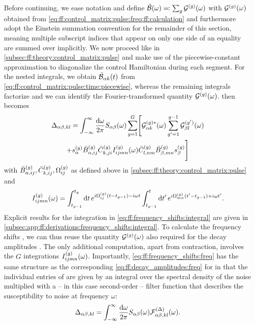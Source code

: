 Before continuing, we ease notation and define $\tilde{\mathcal{B}}(\omega) \eqqcolon \sum_g\mathcal{G}^{(g)}(\omega)$ with $\mathcal{G}^{(g)}(\omega)$ obtained from \cref{eq:ff:control_matrix:pulse:freq:ff:calculation} and furthermore adopt the Einstein summation convention for the remainder of this section, meaning multiple subscript indices that appear on only one side of an equality are summed over implicitly.
We now proceed like in \cref{subsec:ff:theory:control_matrix:pulse} and make use of the piecewise-constant approximation to diagonalize the control Hamiltonian during each segment.
For the nested integrals, we obtain $\tilde{\mathcal{B}}_{\alpha k}(t)$ from \cref{eq:ff:control_matrix:pulse:time:piecewise}, whereas the remaining integrals factorize and we can identify the Fourier-transformed quantity $\mathcal{G}^{(g)}(\omega)$.
 then becomes
\begin{multline}\label{eq:ff:frequency_shifts:freq}
    \Delta_{\alpha\beta,kl} = \int_{-\infty}^\infty\frac{\dd{\omega}}{2\pi} S_{\alpha\beta}(\omega)\sum_{g=1}^G\Biggl[
        \mathcal{G}_{\alpha k}^{(g)\ast}(\omega)\sum_{g^\prime=1}^{g-1}\mathcal{G}_{\beta l}^{(g^\prime)}(\omega) \\
        + s_\alpha^{(g)}\bar{B}_{\alpha,ij}^{(g)}\bar{C}_{k,ji}^{(g)} I_{ijmn}^{(g)}(\omega)
        \bar{C}_{l,nm}^{(g)}\bar{B}_{\beta,mn}^{(g)} s_\beta^{(g)}
        \Biggr]
\end{multline}
with $\bar{B}_{\alpha,ij}^{(g)},\bar{C}_{k,ij}^{(g)},\Omega_{ij}^{(g)}$ as defined above in \cref{subsec:ff:theory:control_matrix:pulse} and
\begin{equation}\label{eq:ff:frequency_shifts:integral}
    I_{ijmn}^{(g)}(\omega) = \int_{t_{g-1}}^{t_g}\dd{t}e^{i\Omega_{ij}^{(g)}(t - t_{g-1}) - i\omega t}
        \int_{t_{g-1}}^{t}\dd{t'}e^{i\Omega_{mn}^{(g)}(t' - t_{g-1}) + i\omega t'}.
\end{equation}
Explicit results for the integration in \cref{eq:ff:frequency_shifts:integral} are given in \cref{subsec:app:ff:derivations:frequency_shifts:integral}.
To calculate the frequency shifts \freqshifts, we can thus reuse the quantity $\mathcal{G}^{(g)}(\omega)$ also required for the decay amplitudes \decayamps.
The only additional computation, apart from contraction, involves the $G$ integrations $I_{ijmn}^{(g)}(\omega)$.
Importantly, \cref{eq:ff:frequency_shifts:freq} has the same structure as the corresponding \cref{eq:ff:decay_amplitudes:freq} for \decayamps in that the individual entries of \freqshifts are given by an integral over the spectral density of the noise multiplied with a -- in this case second-order -- filter function that describes the susceptibility to noise at frequency $\omega$:
\begin{equation}\label{eq:ff:frequency_shifts:filter_function}
    \Delta_{\alpha\beta,kl} = \int_{-\infty}^\infty\frac{\dd{\omega}}{2\pi} S_{\alpha\beta}(\omega) \mathcal{F}_{\alpha\beta,kl}^{(\Delta)}(\omega).
\end{equation}

